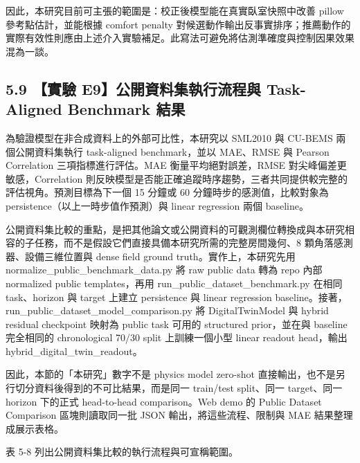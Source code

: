 \documentclass[12pt,a4paper]{article}
\begin{document}
因此，本研究目前可主張的範圍是：校正後模型能在真實臥室快照中改善 pillow 參考點估計，並能根據 comfort penalty 對候選動作輸出反事實排序；推薦動作的實際有效性則應由上述介入實驗補足。此寫法可避免將估測準確度與控制因果效果混為一談。


\subsection*{5.9 【實驗 E9】公開資料集執行流程與 Task-Aligned Benchmark 結果}

為驗證模型在非合成資料上的外部可比性，本研究以 SML2010 與 CU-BEMS 兩個公開資料集執行 task-aligned benchmark，並以 MAE、RMSE 與 Pearson Correlation 三項指標進行評估。MAE 衡量平均絕對誤差，RMSE 對尖峰偏差更敏感，Correlation 則反映模型是否能正確追蹤時序趨勢，三者共同提供較完整的評估視角。預測目標為下一個 15 分鐘或 60 分鐘時步的感測值，比較對象為 persistence（以上一時步值作預測）與 linear regression 兩個 baseline。


公開資料集比較的重點，是把其他論文或公開資料的可觀測欄位轉換成與本研究相容的子任務，而不是假設它們直接具備本研究所需的完整房間幾何、8 顆角落感測器、設備三維位置與 dense field ground truth。實作上，本研究先用 normalize\_\allowbreak{}public\_\allowbreak{}benchmark\_\allowbreak{}data.py 將 raw public data 轉為 repo 內部 normalized public templates，再用 run\_\allowbreak{}public\_\allowbreak{}dataset\_\allowbreak{}benchmark.py 在相同 task、horizon 與 target 上建立 persistence 與 linear regression baseline。接著，run\_\allowbreak{}public\_\allowbreak{}dataset\_\allowbreak{}model\_\allowbreak{}comparison.py 將 DigitalTwinModel 與 hybrid residual checkpoint 映射為 public task 可用的 structured prior，並在與 baseline 完全相同的 chronological 70/30 split 上訓練一個小型 linear readout head，輸出 hybrid\_\allowbreak{}digital\_\allowbreak{}twin\_\allowbreak{}readout。


因此，本節的「本研究」數字不是 physics model zero-shot 直接輸出，也不是另行切分資料後得到的不可比結果，而是同一 train/test split、同一 target、同一 horizon 下的正式 head-to-head comparison。Web demo 的 Public Dataset Comparison 區塊則讀取同一批 JSON 輸出，將這些流程、限制與 MAE 結果整理成展示表格。


表 5-8 列出公開資料集比較的執行流程與可宣稱範圍。
\end{document}
